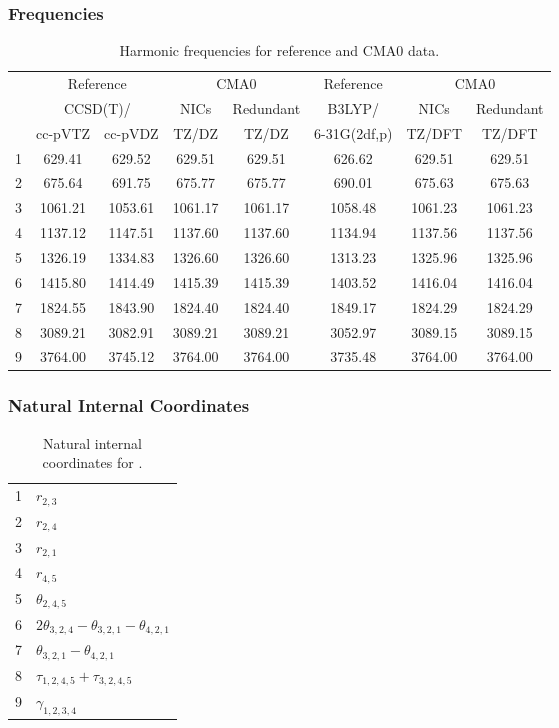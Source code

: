 \documentclass[10pt,oneside]{article}
\begin{document}
\begin{table}[h!]
\subsubsection*{Frequencies}
\centering
\caption{Harmonic frequencies for reference and CMA0 data.}
\begin{tabular}{cccccccc}
\toprule
{} & \multicolumn{2}{c}{Reference} & \multicolumn{2}{c}{CMA0} &    Reference & \multicolumn{2}{c}{CMA0} \\
{} & \multicolumn{2}{c}{CCSD(T)/} &    NICs &  Redundant &       B3LYP/ &    NICs & Redundant \\
{} &   cc-pVTZ & cc-pVDZ &   TZ/DZ &      TZ/DZ & 6-31G(2df,p) &  TZ/DFT &    TZ/DFT \\
\midrule
1 &    629.41 &  629.52 &  629.51 &     629.51 &       626.62 &  629.51 &    629.51 \\
2 &    675.64 &  691.75 &  675.77 &     675.77 &       690.01 &  675.63 &    675.63 \\
3 &   1061.21 & 1053.61 & 1061.17 &    1061.17 &      1058.48 & 1061.23 &   1061.23 \\
4 &   1137.12 & 1147.51 & 1137.60 &    1137.60 &      1134.94 & 1137.56 &   1137.56 \\
5 &   1326.19 & 1334.83 & 1326.60 &    1326.60 &      1313.23 & 1325.96 &   1325.96 \\
6 &   1415.80 & 1414.49 & 1415.39 &    1415.39 &      1403.52 & 1416.04 &   1416.04 \\
7 &   1824.55 & 1843.90 & 1824.40 &    1824.40 &      1849.17 & 1824.29 &   1824.29 \\
8 &   3089.21 & 3082.91 & 3089.21 &    3089.21 &      3052.97 & 3089.15 &   3089.15 \\
9 &   3764.00 & 3745.12 & 3764.00 &    3764.00 &      3735.48 & 3764.00 &   3764.00 \\
\bottomrule
\end{tabular}
\end{table}

\begin{table}[h!]
\subsubsection*{Natural Internal Coordinates}
\centering
\caption{Natural internal coordinates for .}
\small
\begin{tabular}{ll}
\toprule
  1   & $r_{2,3}$ \\
  2   & $r_{2,4}$ \\
  3   & $r_{2,1}$ \\
  4   & $r_{4,5}$ \\
  5   & $\theta_{2,4,5}$ \\
  6   & $2\theta_{3,2,4} - \theta_{3,2,1} - \theta_{4,2,1}$ \\
  7   & $\theta_{3,2,1} - \theta_{4,2,1}$ \\
  8   & $\tau_{1,2,4,5} + \tau_{3,2,4,5}$ \\
  9   & $\gamma_{1,2,3,4}$ \\
\bottomrule
\end{tabular}
\end{table}
\end{document}
